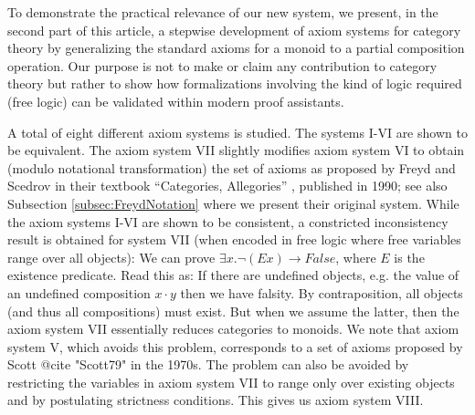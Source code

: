   
To demonstrate the practical relevance of our new system, we present,
in the second part of this article, a stepwise development of axiom
systems for category theory by generalizing the standard axioms for a
monoid to a partial composition operation. Our purpose is not to make
or claim any contribution to category theory but rather to show how
formalizations involving the kind of logic required (free logic) can
be validated within modern proof assistants.

A total of eight different axiom systems is studied. The systems I-VI
are shown to be equivalent. The axiom system VII slightly modifies
axiom system VI to obtain (modulo notational transformation) the set
of axioms as proposed by Freyd and Scedrov in their textbook
``Categories, Allegories'' \cite{FreydScedrov90}, published in 1990;
see also Subsection \ref{subsec:FreydNotation} where we present their
original system.  While the axiom systems I-VI are shown to be
consistent, a constricted inconsistency result is obtained for system
VII (when encoded in free logic where free variables range over all
objects): We can prove $\exists x. \neg(E x) \rightarrow False$, where
$E$ is the existence predicate. Read this as: If there are undefined
objects, e.g. the value of an undefined composition $x\cdot y$
then we have falsity.  By contraposition, all objects (and thus all
compositions) must exist. But when we assume the latter, then the
axiom system VII essentially reduces categories to monoids.  We note
that axiom system V, which avoids this problem, corresponds to a set
of axioms proposed by Scott @{cite "Scott79"} in the 1970s. The
problem can also be avoided by restricting the variables in axiom
system VII to range only over existing objects and by postulating
strictness conditions.  This gives us axiom system VIII.

